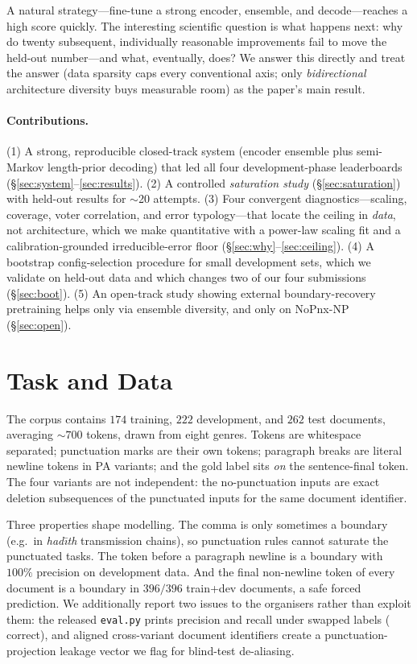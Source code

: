 A natural strategy---fine-tune a strong encoder, ensemble, and decode---reaches a
high score quickly. The interesting scientific question is what happens next: why do
twenty subsequent, individually reasonable improvements fail to move the held-out
number---and what, eventually, does? We answer this directly and treat the answer
(data sparsity caps every conventional axis; only \emph{bidirectional} architecture
diversity buys measurable room) as the paper's main result.

\paragraph{Contributions.}
(1) A strong, reproducible closed-track system (encoder ensemble plus semi-Markov
length-prior decoding) that led all four development-phase leaderboards
(\S\ref{sec:system}--\ref{sec:results}). (2) A controlled \emph{saturation study}
(\S\ref{sec:saturation}) with held-out results for $\sim$20 attempts.
(3) Four convergent diagnostics---scaling, coverage, voter correlation, and error
typology---that locate the ceiling in \emph{data}, not architecture, which we make
quantitative with a power-law scaling fit and a calibration-grounded irreducible-error
floor (\S\ref{sec:why}--\ref{sec:ceiling}). (4) A bootstrap config-selection procedure for small development
sets, which we validate on held-out data and which changes two of our four
submissions (\S\ref{sec:boot}). (5) An open-track study showing external
boundary-recovery pretraining helps only via ensemble diversity, and only on
NoPnx-NP (\S\ref{sec:open}).

\section{Task and Data}
The corpus contains $174$ training, $222$ development, and $262$ test documents,
averaging $\sim$$700$ tokens, drawn from eight genres. Tokens are whitespace
separated; punctuation marks are their own tokens; paragraph breaks are literal
newline tokens in PA variants; and the gold label sits \emph{on} the sentence-final
token. The four variants are not independent: the no-punctuation inputs are exact
deletion subsequences of the punctuated inputs for the same document identifier.

Three properties shape modelling. The comma is only sometimes a boundary (e.g.\ in
\textit{had{\=\i}th} transmission chains), so punctuation rules cannot saturate the
punctuated tasks. The token before a paragraph newline is a boundary with $100\%$
precision on development data. And the final non-newline token of every document is a
boundary in $396/396$ train+dev documents, a safe forced prediction. We additionally
report two issues to the organisers rather than exploit them: the released
\texttt{eval.py} prints precision and recall under swapped labels (\fone{} correct),
and aligned cross-variant document identifiers create a punctuation-projection
leakage vector we flag for blind-test de-aliasing.

